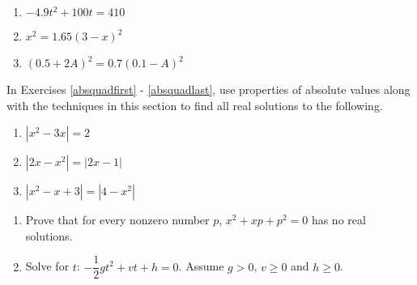 \documentclass[11pt]{article}
\theoremstyle{definition}  %
\newcounter{HW}
\begin{document}
\begin{multicols}{3}
\begin{enumerate}
\setcounter{enumi}{\value{HW}}

\item $-4.9t^2 + 100t = 410$
\item $x^2 = 1.65(3-x)^2$
\item $(0.5+2A)^2 = 0.7(0.1-A)^2$ \label{solvequadcalclast}

\setcounter{HW}{\value{enumi}}
\end{enumerate}
\end{multicols}







In Exercises \ref{absquadfirst} - \ref{absquadlast}, use properties of absolute values along with the techniques in this section to find all real solutions to the following.

\begin{multicols}{3}
\begin{enumerate}
\setcounter{enumi}{\value{HW}}

\item $|x^2 - 3x| = 2$ \label{absquadfirst}
\item $|2x-x^2| = |2x-1|$
\item $|x^2 -x + 3| = |4-x^2|$ \label{absquadlast}

\setcounter{HW}{\value{enumi}}
\end{enumerate}
\end{multicols}

\begin{enumerate}
\setcounter{enumi}{\value{HW}}

\item  Prove that for every nonzero number $p$, $x^2 + xp + p^2 = 0$  has no real solutions.

\item  Solve for $t$: $-\dfrac{1}{2} g t^2 + vt + h = 0$. Assume $g > 0$, $v \geq 0$ and $h \geq 0$.

\setcounter{HW}{\value{enumi}}
\end{enumerate}
\end{document}
